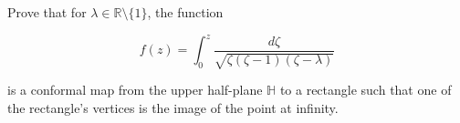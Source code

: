 Prove that for $\lambda \in \mathbb{R} \setminus \{1\}$, the function

$$
f(z) = \int_0^z \frac{d\zeta}{\sqrt{\zeta (\zeta - 1)(\zeta - \lambda)}}
$$

is a conformal map from the upper half-plane $\mathbb{H}$ to a rectangle such that one of the rectangle's vertices is 
the image of the point at infinity.

\begin{solution}
  \ \\
\end{solution}